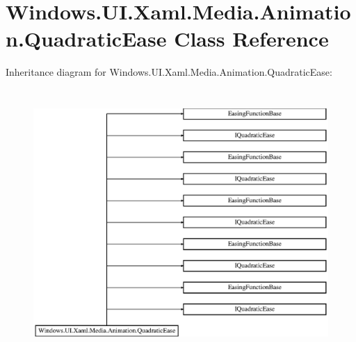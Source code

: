 \hypertarget{class_windows_1_1_u_i_1_1_xaml_1_1_media_1_1_animation_1_1_quadratic_ease}{}\section{Windows.\+U\+I.\+Xaml.\+Media.\+Animation.\+Quadratic\+Ease Class Reference}
\label{class_windows_1_1_u_i_1_1_xaml_1_1_media_1_1_animation_1_1_quadratic_ease}
Inheritance diagram for Windows.\+U\+I.\+Xaml.\+Media.\+Animation.\+Quadratic\+Ease\+:\begin{figure}[H]
\begin{center}
\leavevmode
\includegraphics[height=10.165016cm]{class_windows_1_1_u_i_1_1_xaml_1_1_media_1_1_animation_1_1_quadratic_ease}
\end{center}
\end{figure}
